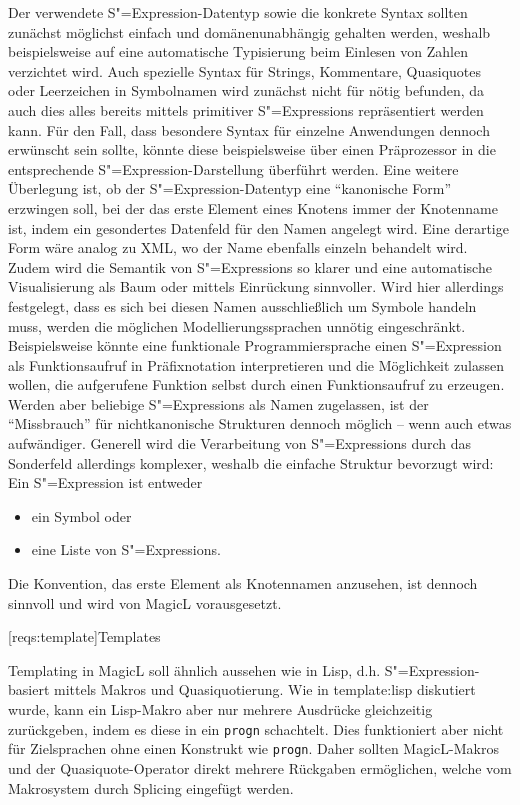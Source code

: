 \documentclass[12pt, a4paper, bibgerm]{scrbook}
\newcommand\icode[1]{\lstinline?#1?}
\newcommand\lsection{}
\newcommand\sref{}
\newcommand{\sexp}{S"=Expression}
\newcommand{\sexps}{S"=Expressions}
\begin{document}
Der verwendete \sexp{}-Datentyp sowie die konkrete Syntax sollten
zunächst möglichst einfach und domänenunabhängig gehalten werden,
weshalb beispielsweise auf eine automatische Typisierung beim Einlesen
von Zahlen verzichtet wird. Auch spezielle Syntax für Strings,
Kommentare, Quasiquotes oder Leerzeichen in Symbolnamen wird zunächst
nicht für nötig befunden, da auch dies alles bereits mittels primitiver
\sexps{} repräsentiert werden kann. Für den Fall, dass besondere Syntax
für einzelne Anwendungen dennoch erwünscht sein sollte, könnte diese
beispielsweise über einen Präprozessor in die entsprechende
\sexp{}-Darstellung überführt werden. Eine weitere Überlegung ist, ob der
\sexp{}-Datentyp eine "`kanonische Form"' erzwingen soll, bei der das
erste Element eines Knotens immer der Knotenname ist, indem ein
gesondertes Datenfeld für den Namen angelegt wird. Eine derartige Form
wäre analog zu XML, wo der Name ebenfalls einzeln behandelt wird. Zudem
wird die Semantik von \sexps{} so klarer und eine automatische
Visualisierung als Baum oder mittels Einrückung sinnvoller.  Wird hier
allerdings festgelegt, dass es sich bei diesen Namen ausschließlich um
Symbole handeln muss, werden die möglichen Modellierungssprachen unnötig
eingeschränkt. Beispielsweise könnte eine funktionale Programmiersprache
einen \sexp{} als Funktionsaufruf in Präfixnotation interpretieren und
die Möglichkeit zulassen wollen, die aufgerufene Funktion selbst durch
einen Funktionsaufruf zu erzeugen. Werden aber beliebige \sexps{} als
Namen zugelassen, ist der "`Missbrauch"' für nichtkanonische Strukturen
dennoch möglich -- wenn auch etwas aufwändiger. Generell wird die
Verarbeitung von \sexps{} durch das Sonderfeld allerdings komplexer,
weshalb die einfache Struktur bevorzugt wird: Ein \sexp{} ist entweder 
\begin{itemize}
\item ein Symbol oder 
\item eine Liste von \sexps{}.
\end{itemize}
Die Konvention, das erste Element als Knotennamen anzusehen, ist dennoch
sinnvoll und wird von MagicL vorausgesetzt.

\lsection[reqs:template]{Templates}

Templating in MagicL soll ähnlich aussehen wie in Lisp,
d.h. \sexp{}-basiert mittels Makros und Quasiquotierung. Wie in
\sref{template:lisp} diskutiert wurde, kann ein Lisp-Makro aber nur
mehrere Ausdrücke gleichzeitig zurückgeben, indem es diese in ein
\icode{progn} schachtelt. Dies funktioniert aber nicht für Zielsprachen
ohne einen Konstrukt wie \icode{progn}. Daher sollten MagicL-Makros und
der Quasiquote-Operator direkt mehrere Rückgaben ermöglichen,
welche vom Makrosystem durch Splicing eingefügt werden.
\end{document}
